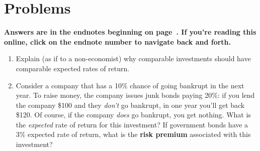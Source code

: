 



\bigskip
\bigskip
\section*{Problems}

\noindent \textbf{Answers are in the endnotes beginning on page~\pageref{1transitiona}. If you're reading this online, click on the endnote number to navigate back and forth.}

\begin{enumerate}


\item \label{1transitionq}Explain (as if to a non-economist) why comparable investments should have comparable expected rates of return.







\item \label{junkbonds} Consider a company that has a 10\% chance of going bankrupt in the next year. To raise money, the company issues junk bonds paying 20\%: if you lend the company \$100 and they \emph{don't} go bankrupt, in one year you'll get back \$120. Of course, if the company \emph{does} go bankrupt, you get nothing. What is the \emph{expected} rate of return for this investment? If government bonds have a 3\% expected rate of return, what is the \textbf{risk premium} associated with this investment?


\end{enumerate}

